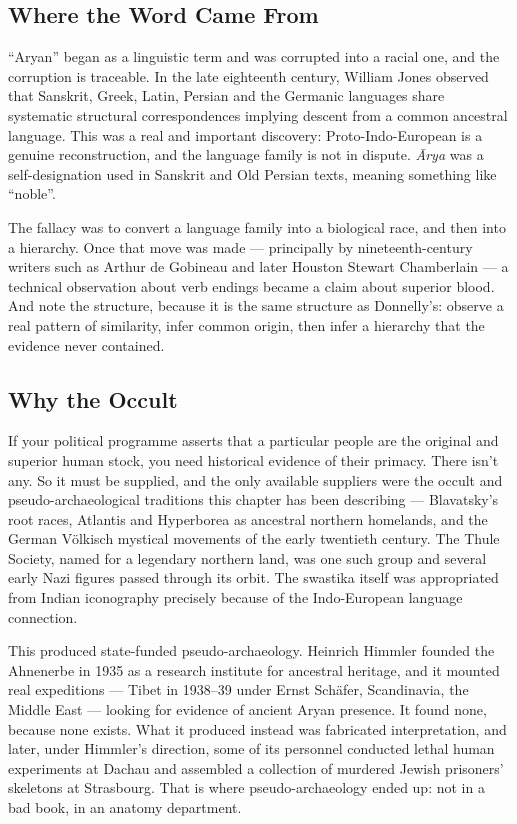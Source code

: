 \subsection{Where the Word Came From}

``Aryan'' began as a linguistic term and was corrupted into a racial one, and the corruption is
traceable. In the late eighteenth century, William Jones observed that Sanskrit, Greek, Latin, Persian
and the Germanic languages share systematic structural correspondences implying descent from a common
ancestral language. This was a real and important discovery: Proto-Indo-European is a genuine
reconstruction, and the language family is not in dispute. \emph{Ārya} was a self-designation used in
Sanskrit and Old Persian texts, meaning something like ``noble''.

The fallacy was to convert a language family into a biological race, and then into a hierarchy. Once
that move was made --- principally by nineteenth-century writers such as Arthur de Gobineau and later
Houston Stewart Chamberlain --- a technical observation about verb endings became a claim about
superior blood. And note the structure, because it is the same structure as Donnelly's: observe a real
pattern of similarity, infer common origin, then infer a hierarchy that the evidence never contained.

\subsection{Why the Occult}


If your political programme asserts that a particular people are the original and superior human
stock, you need historical evidence of their primacy. There isn't any. So it must be supplied, and the
only available suppliers were the occult and pseudo-archaeological traditions this chapter has been
describing --- Blavatsky's root races, Atlantis and Hyperborea as ancestral northern homelands, and
the German Völkisch mystical movements of the early twentieth century. The Thule Society, named for a
legendary northern land, was one such group and several early Nazi figures passed through its orbit.
The swastika itself was appropriated from Indian iconography precisely because of the Indo-European
language connection.

This produced state-funded pseudo-archaeology. Heinrich Himmler founded the Ahnenerbe in 1935 as a
research institute for ancestral heritage, and it mounted real expeditions --- Tibet in 1938--39 under
Ernst Schäfer, Scandinavia, the Middle East --- looking for evidence of ancient Aryan presence. It
found none, because none exists. What it produced instead was fabricated interpretation, and later,
under Himmler's direction, some of its personnel conducted lethal human experiments at Dachau and
assembled a collection of murdered Jewish prisoners' skeletons at Strasbourg. That is where
pseudo-archaeology ended up: not in a bad book, in an anatomy department.

